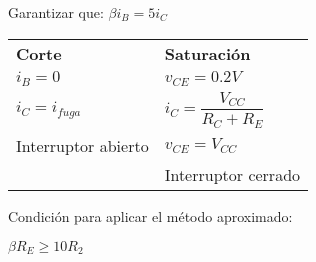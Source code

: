 \documentclass[11pt,a4paper]{article}
\begin{document}
\begin{multicols}{2}
\begin{cajita}
			
			\vspace{-.3cm}
		
			\begin{flushleft}
				Garantizar que: $\beta i_B = 5 i_C$
			\end{flushleft}
			\begin{tabular}{l l}
				\textbf{Corte} 		& \textbf{Saturación} 				\\[.1cm]
				$i_B = 0$ 			& $v_{CE} = 0.2 V$ 					\\[.1cm]
				$i_C = i_{fuga}$ 	& $i_C = \dfrac{V_{CC}}{R_C + R_E}$	\\[.1cm]
				Interruptor abierto & $v_{CE} = V_{CC}$ 				\\[.1cm]
				& Interruptor cerrado
			\end{tabular}
	
			\vspace{-.8cm}
		
			\begin{flushleft}
				Condición para aplicar el método aproximado:
			\end{flushleft}
				$\beta R_E \geq 10 R_2$\\
		\end{cajita}

	\end{multicols}
\end{document}
